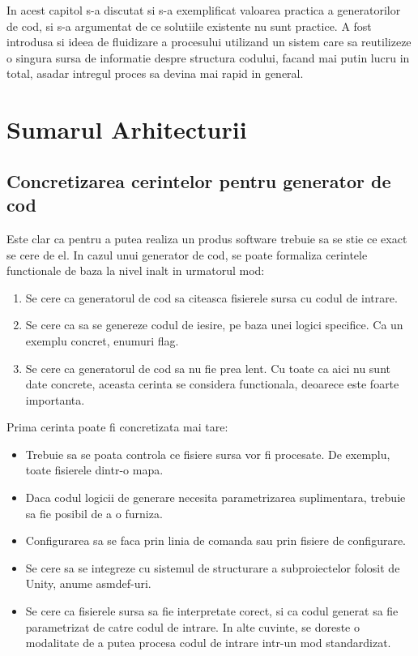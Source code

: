\documentclass{report}
\begin{document}
In acest capitol s-a discutat si s-a exemplificat valoarea practica a
generatorilor de cod, si s-a argumentat de ce solutiile existente nu
sunt practice. A fost introdusa si ideea de fluidizare a procesului
utilizand un sistem care sa reutilizeze o singura sursa de informatie
despre structura codului, facand mai putin lucru in total, asadar
intregul proces sa devina mai rapid in general.

\chapter{Sumarul Arhitecturii}

\section{Concretizarea cerintelor pentru generator de cod}

Este clar ca pentru a putea realiza un produs software trebuie sa se
stie ce exact se cere de el. In cazul unui generator de cod, se poate
formaliza cerintele functionale de baza la nivel inalt in urmatorul mod:

\begin{enumerate}
\item
  Se cere ca generatorul de cod sa citeasca fisierele sursa cu codul de
  intrare.
\item
  Se cere ca sa se genereze codul de iesire, pe baza unei logici
  specifice. Ca un exemplu concret, enumuri flag.
\item
  Se cere ca generatorul de cod sa nu fie prea lent. Cu toate ca aici nu
  sunt date concrete, aceasta cerinta se considera functionala, deoarece
  este foarte importanta.
\end{enumerate}

Prima cerinta poate fi concretizata mai tare:

\begin{itemize}
\item
  Trebuie sa se poata controla ce fisiere sursa vor fi procesate. De
  exemplu, toate fisierele dintr-o mapa.
\item
  Daca codul logicii de generare necesita parametrizarea suplimentara,
  trebuie sa fie posibil de a o furniza.
\item
  Configurarea sa se faca prin linia de comanda sau prin fisiere de
  configurare.
\item
  Se cere sa se integreze cu sistemul de structurare a subproiectelor
  folosit de Unity, anume asmdef-uri.
\item
  Se cere ca fisierele sursa sa fie interpretate corect, si ca codul
  generat sa fie parametrizat de catre codul de intrare. In alte
  cuvinte, se doreste o modalitate de a putea procesa codul de intrare
  intr-un mod standardizat.
\end{itemize}
\end{document}
